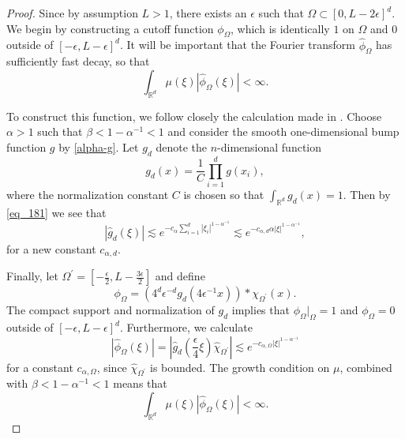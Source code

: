 \begin{proof}
 Since by assumption $L > 1$, there exists an $\epsilon$ such that $\Omega\subset [0,L-2\epsilon]^d$. We begin by constructing a cutoff function $\phi_\Omega$, which is identically $1$ on $\Omega$ and $0$ outside of $[-\epsilon, L-\epsilon]^d$. It will be important that the Fourier transform $\hat{\phi}_\Omega$ has sufficiently fast decay, so that
 \begin{equation}
  \int_{\mathbb{R}^d}\mu(\xi)|\hat{\phi}_\Omega(\xi)| < \infty.
 \end{equation}
 
 To construct this function, we follow closely the calculation made in \cite{johnson2015saddle}. Choose $\alpha > 1$ such that $\beta < 1-\alpha^{-1} < 1$ and consider the smooth one-dimensional bump function $g$ by \eqref{alpha-g}.
 Let $g_d$ denote the $n$-dimensional function
 \begin{equation}
  g_d(x) = \frac{1}{C}\prod_{i=1}^d g(x_i),
 \end{equation}
 where the normalization constant $C$ is chosen so that $\int_{\mathbb{R}^d} g_d(x) = 1$. Then by \eqref{eq_181} we see that
 \begin{equation}
  |\hat{g}_d(\xi)|\lesssim e^{-c_\alpha\sum_{i=1}^d|\xi_i|^{1-\alpha^{-1}}} \lesssim e^{-c_{\alpha,d}\alpha|\xi|^{1-\alpha^{-1}}},
 \end{equation}
 for a new constant $c_{\alpha,d}$.
 
 Finally, let $\Omega^\prime = [-\frac{\epsilon}{2}, L - \frac{3\epsilon}{2}]$ and define
 \begin{equation}
  \phi_\Omega = \left(4^d\epsilon^{-d}g_d\left(4\epsilon^{-1}x\right)\right)*\chi_{\Omega^\prime}(x).
 \end{equation}
 The compact support and normalization of $g_d$  implies that $\phi_\Omega|_\Omega = 1$ and $\phi_\Omega = 0$ outside of $[-\epsilon, L-\epsilon]^d$. Furthermore, we calculate
 \begin{equation}
  |\hat{\phi}_\Omega(\xi)| = \left|\hat{g}_d\left(\frac{\epsilon}{4}\xi\right)\widehat{\chi}_{\Omega^\prime}\right| \lesssim e^{-c_{\alpha,\Omega}|\xi|^{1-\alpha^{-1}}}
 \end{equation}
 for a constant $c_{\alpha,\Omega}$, since $\widehat{\chi}_{\Omega^\prime}$ is bounded. The growth condition on $\mu$, combined with $\beta < 1-\alpha^{-1} < 1$ means that
 \begin{equation}\label{eq_205}
  \int_{\mathbb{R}^d}\mu(\xi)|\hat{\phi}_\Omega(\xi)| < \infty.
 \end{equation}
 

\end{proof}
